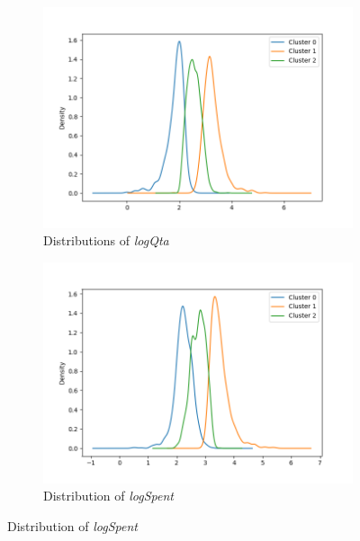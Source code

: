 \begin{figure}[h!]
    \centering
    \begin{subfigure}{0.49\textwidth}
        \includegraphics[width=\linewidth]{img/clust_1/logqta_km.png}
        \caption{Distributions of \emph{logQta}}
        \label{fig:logqta}
    \end{subfigure}
    \begin{subfigure}{0.49\textwidth}
        \centering
        \includegraphics[width=\linewidth]{img/clust_1/logspent_km.png}
        \caption{Distribution of \emph{logSpent}}
        \label{fig:logspent}


\end{subfigure}
\end{figure}
